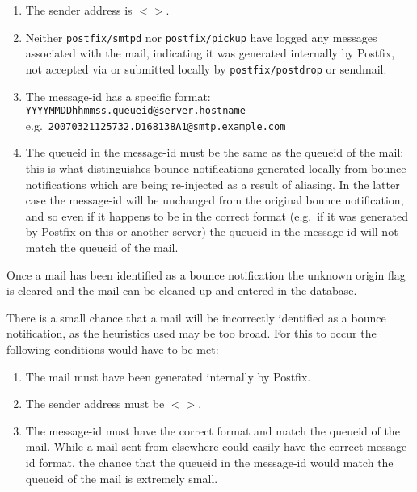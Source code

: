 \documentclass[a4paper,12pt,draft]{article}
\newcommand{\daemon}[1]{%
    \texttt{postfix/#1}%
}
\begin{document}
\begin{enumerate}

    \item The sender address is $<>$.

    \item Neither \daemon{smtpd} nor \daemon{pickup} have logged any
        messages associated with the mail, indicating it was generated
        internally by Postfix, not accepted via \SMTP{} or submitted
        locally by \daemon{postdrop} or sendmail.

    \item The message-id has a specific format: \newline
        \texttt{YYYYMMDDhhmmss.queueid@server.hostname} \newline
        e.g.\ \texttt{20070321125732.D168138A1@smtp.example.com}

    \item The queueid in the message-id must be the same as the queueid of
        the mail: this is what distinguishes bounce notifications generated
        locally from bounce notifications which are being re-injected as a
        result of aliasing.  In the latter case the message-id will be
        unchanged from the original bounce notification, and so even if it
        happens to be in the correct format (e.g.\ if it was generated by
        Postfix on this or another server) the queueid in the message-id
        will not match the queueid of the mail.

\end{enumerate}

Once a mail has been identified as a bounce notification the unknown origin
flag is cleared and the mail can be cleaned up and entered in the database.

There is a small chance that a mail will be incorrectly identified as a
bounce notification, as the heuristics used may be too broad.  For this to
occur the following conditions would have to be met:

\begin{enumerate}

    \item The mail must have been generated internally by Postfix.

    \item The sender address must be $<>$.

    \item The message-id must have the correct format and match the queueid
        of the mail.  While a mail sent from elsewhere could easily have
        the correct message-id format, the chance that the queueid in the
        message-id would match the queueid of the mail is extremely small.

\end{enumerate}
\end{document}
